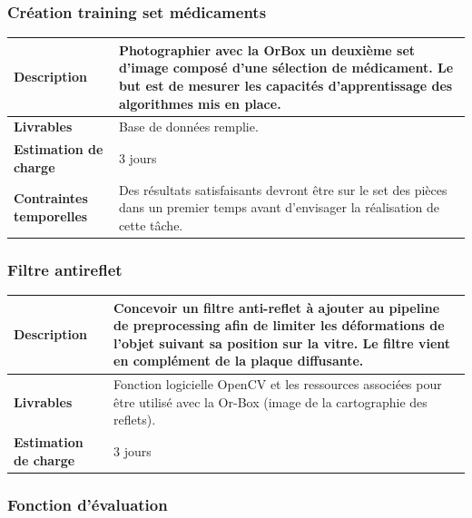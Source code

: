\subsubsection{Création training set médicaments}

\begin{tabularx}{13cm}{lX}
    \toprule
        \textbf{Description} &
        Photographier avec la OrBox un deuxième set d'image composé d'une sélection de médicament.
        Le but est de mesurer les capacités d'apprentissage des algorithmes mis en place. \\
    \midrule
        \textbf{Livrables} &
        Base de données remplie. \\
    \midrule
        \textbf{Estimation de charge} &
        3 jours \\
    \midrule
        \textbf{Contraintes temporelles} &
        Des résultats satisfaisants devront être sur le set des pièces dans un premier temps avant d'envisager la réalisation de cette tâche. \\
    \bottomrule
\end{tabularx}

\subsubsection{Filtre antireflet}

\begin{tabularx}{13cm}{lX}
    \toprule
        \textbf{Description} &
        Concevoir un filtre anti-reflet à ajouter au pipeline de preprocessing afin de limiter les déformations de l'objet suivant sa position sur la vitre.
        Le filtre vient en complément de la plaque diffusante. \\
    \midrule
        \textbf{Livrables} &
        Fonction logicielle OpenCV et les ressources associées pour être utilisé avec la Or-Box (image de la cartographie des reflets). \\
    \midrule
        \textbf{Estimation de charge} &
        3 jours \\
    \bottomrule
\end{tabularx}

\subsubsection{Fonction d'évaluation}
\label{TachEvalFun}

